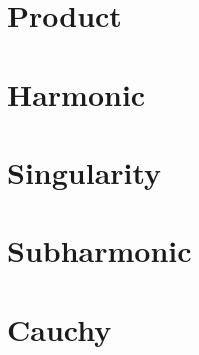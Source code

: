 \documentclass[12pt,letterpaper]{article}
\begin{document}
\section{Product}
\begin{itemize}\setlength\itemsep{4em}\onlyitems[none, include=product]
\mylist
\end{itemize}
\newpage

\section{Harmonic}
\begin{itemize}\setlength\itemsep{4em}\onlyitems[none, include=harmonic]
\mylist
\end{itemize}
\newpage

\section{Singularity}
\begin{itemize}\setlength\itemsep{4em}\onlyitems[none, include=singularity]
\mylist
\end{itemize}
\newpage

\section{Subharmonic}
\begin{itemize}\setlength\itemsep{4em}\onlyitems[none, include=subharmonic]
\mylist
\end{itemize}
\newpage

\section{Cauchy}
\begin{itemize}\setlength\itemsep{4em}\onlyitems[none, include=cauchy]
\mylist
\end{itemize}
\newpage
\end{document}
